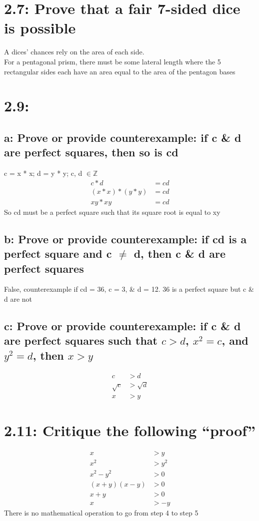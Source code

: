 \documentclass{article}
\begin{document}
\section*{2.7: Prove that a fair 7-sided dice is possible} 
A dices' chances rely on the area of each side. \\
For a pentagonal prism, there must be some lateral length where the 5 rectangular sides each have an area equal to the area of the pentagon bases \\
\section*{2.9:}
\subsection*{a: Prove or provide counterexample: if c \& d are perfect squares, then so is cd}
c = x * x; \: d = y * y; \: c, d $\in \mathbb{Z}$ \\
\begin{align*}
  c * d &= cd \\
  (x * x) * (y * y) &= cd \\
  xy * xy &= cd
\end{align*}
So cd must be a perfect square such that its square root is equal to xy
\subsection*{b: Prove or provide counterexample: if cd is a perfect square and c $\neq$ d, then c \& d are perfect squares}
False, counterexample if cd = 36, c = 3, \& d = 12. 36 is a perfect square but c \& d are not
\subsection*{c: Prove or provide counterexample: if c \& d are perfect squares such that $c > d$, $x^2 = c$, and $y^2 = d$, then $x > y$}
\begin{align*}
  c &> d \\
  \sqrt{c} &> \sqrt{d} \\
  x &> y
\end{align*}
\section*{2.11: Critique the following ``proof''}
\begin{align*}
x &> y \\
x^2 &> y^2 \\
x^2 - y^2 &> 0 \\
(x+y)(x-y) &> 0 \\
x + y &> 0 \\
x &> -y
\end{align*}
There is no mathematical operation to go from step 4 to step 5 \\
\end{document}
